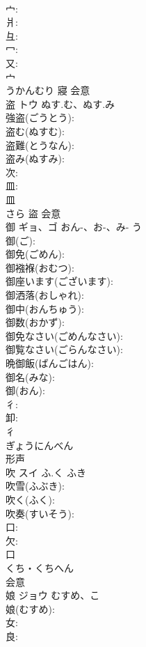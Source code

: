 \documentclass[8pt]{extreport}
\begin{document}
\begin{CJK}{UTF8}{min}
\\	宀: 
\\	爿: 
\\	彑: 
\\	冖: 
\\	又: 
\\	宀	
\\	うかんむり	寢	会意 
\\	盗	トウ	ぬす.む、ぬす.み		
\\	強盗(ごうとう): 
\\	盗む(ぬすむ): 
\\	盗難(とうなん): 
\\	盗み(ぬすみ): 
\\	次: 
\\	皿: 
\\	皿	
\\	さら	盜	会意 
\\	御	ギョ、ゴ	おん-、お-、み-	う	
\\	御(ご): 
\\	御免(ごめん): 
\\	御襁褓(おむつ): 
\\	御座います(ございます): 
\\	御洒落(おしゃれ): 
\\	御中(おんちゅう): 
\\	御数(おかず): 
\\	御免なさい(ごめんなさい): 
\\	御覧なさい(ごらんなさい): 
\\	晩御飯(ばんごはん): 
\\	御名(みな): 
\\	御(おん): 
\\	彳: 
\\	卸: 
\\	彳	
\\	ぎょうにんべん	
\\	形声 
\\	吹	スイ	ふ.く	ふき	
\\	吹雪(ふぶき): 
\\	吹く(ふく): 
\\	吹奏(すいそう): 
\\	口: 
\\	欠: 
\\	口	
\\	くち・くちへん	
\\	会意 
\\	娘	ジョウ	むすめ、こ		
\\	娘(むすめ): 
\\	女: 
\\	良: 

\end{CJK}
\end{document}

